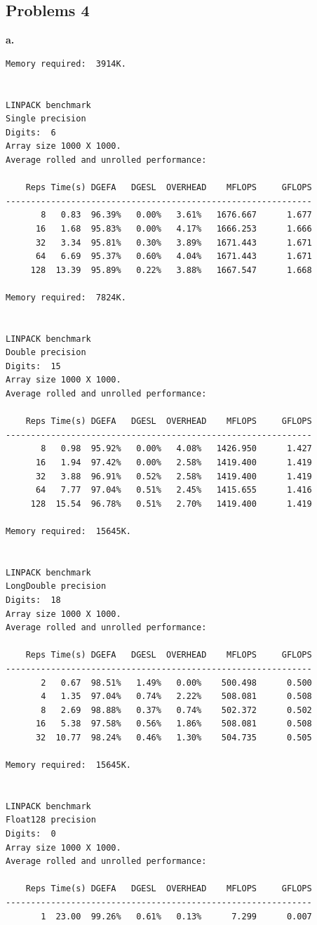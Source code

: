 \documentclass[11pt,fleqn]{exam}
\begin{document}
\subsection*{Problems 4}
\textbf{a.} \\
\lstset{language=bash}
\begin{lstlisting}
Memory required:  3914K.


LINPACK benchmark
Single precision
Digits:  6 
Array size 1000 X 1000.
Average rolled and unrolled performance:

    Reps Time(s) DGEFA   DGESL  OVERHEAD    MFLOPS     GFLOPS
-------------------------------------------------------------
       8   0.83  96.39%   0.00%   3.61%   1676.667      1.677
      16   1.68  95.83%   0.00%   4.17%   1666.253      1.666
      32   3.34  95.81%   0.30%   3.89%   1671.443      1.671
      64   6.69  95.37%   0.60%   4.04%   1671.443      1.671
     128  13.39  95.89%   0.22%   3.88%   1667.547      1.668

Memory required:  7824K.


LINPACK benchmark
Double precision
Digits:  15 
Array size 1000 X 1000.
Average rolled and unrolled performance:

    Reps Time(s) DGEFA   DGESL  OVERHEAD    MFLOPS     GFLOPS
-------------------------------------------------------------
       8   0.98  95.92%   0.00%   4.08%   1426.950      1.427
      16   1.94  97.42%   0.00%   2.58%   1419.400      1.419
      32   3.88  96.91%   0.52%   2.58%   1419.400      1.419
      64   7.77  97.04%   0.51%   2.45%   1415.655      1.416
     128  15.54  96.78%   0.51%   2.70%   1419.400      1.419

Memory required:  15645K.


LINPACK benchmark
LongDouble precision
Digits:  18 
Array size 1000 X 1000.
Average rolled and unrolled performance:

    Reps Time(s) DGEFA   DGESL  OVERHEAD    MFLOPS     GFLOPS
-------------------------------------------------------------
       2   0.67  98.51%   1.49%   0.00%    500.498      0.500
       4   1.35  97.04%   0.74%   2.22%    508.081      0.508
       8   2.69  98.88%   0.37%   0.74%    502.372      0.502
      16   5.38  97.58%   0.56%   1.86%    508.081      0.508
      32  10.77  98.24%   0.46%   1.30%    504.735      0.505

Memory required:  15645K.


LINPACK benchmark
Float128 precision
Digits:  0 
Array size 1000 X 1000.
Average rolled and unrolled performance:

    Reps Time(s) DGEFA   DGESL  OVERHEAD    MFLOPS     GFLOPS
-------------------------------------------------------------
       1  23.00  99.26%   0.61%   0.13%      7.299      0.007
       
\end{lstlisting}
\end{document}
